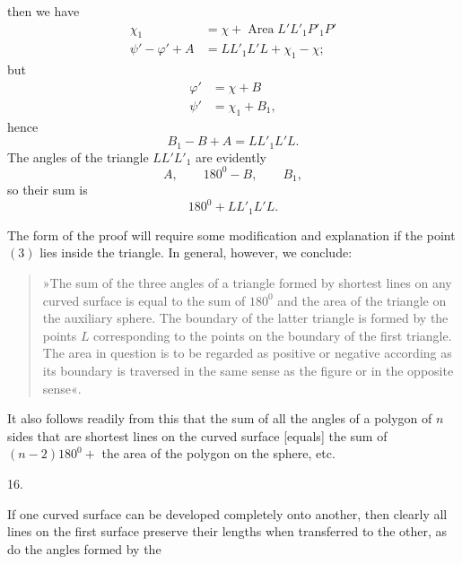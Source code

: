 %
then we have
\[
\begin{aligned}
\chi_1&=\chi+\operatorname{Area}L'L'_1P'_1P'\\
\psi'-\varphi'+A&=LL'_1L'L+\chi_1-\chi;
\end{aligned}
\]
but
\[
\begin{aligned}
\varphi'&=\chi+B\\
\psi'&=\chi_1+B_1,
\end{aligned}
\]
hence
\[
B_1-B+A=LL'_1L'L.
\]
The angles of the triangle $LL'L'_1$ are evidently
\[
A,\qquad 180^{0}-B,\qquad B_1,
\]
so their sum is
\[
180^{0}+LL'_1L'L.
\]

The form of the proof will require some modification and explanation if the point $(3)$ lies inside the triangle. In general, however, we conclude:
\begin{quote}
»The sum of the three angles of a triangle formed by shortest lines on any curved surface is equal to the sum of $180^{0}$ and the area of the triangle on the auxiliary sphere. The boundary of the latter triangle is formed by the points $L$ corresponding to the points on the boundary of the first triangle. The area in question is to be regarded as positive or negative according as its boundary is traversed in the same sense as the figure or in the opposite sense«.
\end{quote}
\noindent\hspace*{1.2em}It also follows readily from this that the sum of all the angles of a polygon of $n$ sides that are shortest lines on the curved surface [equals] the sum of $(n-2)180^{0}+$ the area of the polygon on the sphere, etc.

\begin{center}16.\end{center}
\noindent\hspace*{1.2em}If one curved surface can be developed completely onto another, then clearly all lines on the first surface preserve their lengths when transferred to the other, as do the angles formed by the
